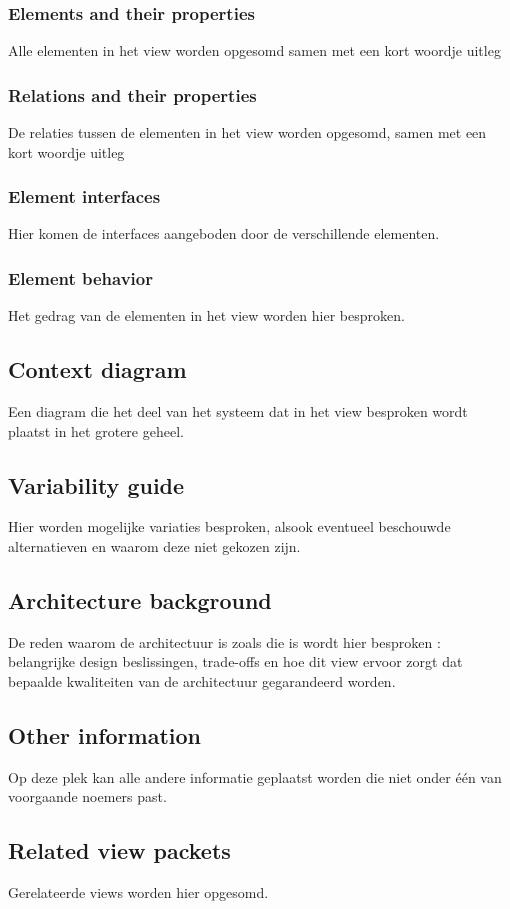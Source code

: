 \documentclass[a4paper,10pt]{article}
\begin{document}
\subsubsection{Elements and their properties}
Alle elementen in het view worden opgesomd samen met een kort woordje uitleg
\subsubsection{Relations and their properties}
De relaties tussen de elementen in het view worden opgesomd, samen met een kort woordje uitleg
\subsubsection{Element interfaces}
Hier komen de interfaces aangeboden door de verschillende elementen.
\subsubsection{Element behavior}
Het gedrag van de elementen in het view worden hier besproken.
\subsection{Context diagram}
Een diagram die het deel van het systeem dat in het view besproken wordt plaatst in het grotere geheel.
\subsection{Variability guide}
Hier worden mogelijke variaties besproken, alsook eventueel beschouwde alternatieven en waarom deze niet gekozen zijn.
\subsection{Architecture background}
De reden waarom de architectuur is zoals die is wordt hier besproken : belangrijke design beslissingen, trade-offs en hoe dit view ervoor zorgt dat bepaalde kwaliteiten van de architectuur gegarandeerd worden.
\subsection{Other information}
Op deze plek kan alle andere informatie geplaatst worden die niet onder één van voorgaande noemers past.
\subsection{Related view packets}
Gerelateerde views worden hier opgesomd.
\end{document}
